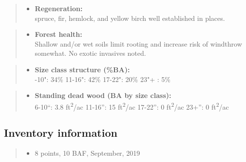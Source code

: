 \documentclass[]{tufte-handout}
\providecommand{\tightlist}{%
  \setlength{\itemsep}{0pt}\setlength{\parskip}{0pt}}
\begin{document}
\begin{quote}
\begin{itemize}
\tightlist
\item
  \textbf{Regeneration:}\\
  \vspace{2pt} spruce, fir, hemlock, and yellow birch well established
  in places.
\end{itemize}
\end{quote}

\begin{quote}
\begin{itemize}
\tightlist
\item
  \textbf{Forest health:}\\
  \vspace{2pt} Shallow and/or wet soils limit rooting and increase risk
  of windthrow somewhat. No exotic invasives noted.
\end{itemize}
\end{quote}

\begin{quote}
\begin{itemize}
\tightlist
\item
  \textbf{Size class structure (\%BA):}\\
  \vspace{2pt} -10": 34\% \textbar{} 11-16": 42\% \textbar{}
  17-22": 20\% \textbar{} 23"+ : 5\%
\end{itemize}
\end{quote}

\begin{quote}
\begin{itemize}
\tightlist
\item
  \textbf{Standing dead wood (BA by size class):}\\
  \vspace{2pt} \indent \small 6-10``: 3.8 ft\textsuperscript{2}/ac
  \textbar{} 11-16'': 15 ft\textsuperscript{2}/ac \textbar{} 17-22'': 0
  ft\textsuperscript{2}/ac \textbar{} 23+'': 0 ft\textsuperscript{2}/ac
\end{itemize}
\end{quote}

\subsection{Inventory information}\label{inventory-information-6}

\begin{quote}
\begin{itemize}
\tightlist
\item
  8 points, 10 BAF, September, 2019
\end{itemize}
\end{quote}
\end{document}
